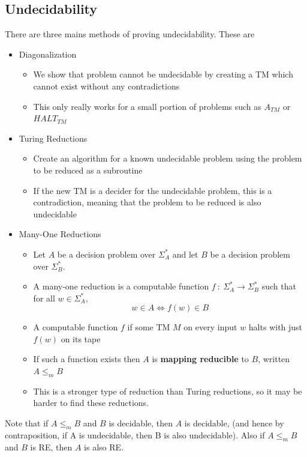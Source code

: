 \documentclass{article}
\begin{document}
    \subsection{Undecidability}
        There are three mains methods of proving undecidability. These are
        \begin{itemize}
            \item Diagonalization
            \begin{itemize}
                \item We show that problem cannot be undecidable by creating a TM which cannot exist without any contradictions
                \item This only really works for a small portion of problems such as $A_{TM}$ or $HALT_{TM}$
            \end{itemize}
            \item Turing Reductions
            \begin{itemize}
                \item Create an algorithm for a known undecidable problem using the problem to be reduced as a subroutine
                \item If the new TM is a decider for the undecidable problem, this is a contradiction, meaning that the problem to be reduced is also undecidable
            \end{itemize}
            \item Many-One Reductions
            \begin{itemize}
                \item Let $A$ be a decision problem over $\Sigma^*_A$ and let $B$ be a decision problem over $\Sigma^*_B$.
                \item A many-one reduction is a computable function $f \ : \ \Sigma^*_A \to \Sigma^*_B$ such that for all $w \in \Sigma^*_A$, 
                \[ w \in A \iff f(w) \in B \]
                \item A computable function $f$ if some TM $M$ on every input $w$ halts with just $f(w)$ on its tape
                \item If such a function exists then $A$ is \textbf{mapping reducible} to $B$, written $A \leq_m B$
                \item This is a stronger type of reduction than Turing reductions, so it may be harder to find these reductions. 
            \end{itemize}
        \end{itemize}
        Note that if $A \leq_m B$ and $B$ is decidable, then $A$ is decidable, (and hence by contraposition, if A is undecidable, then B is also undecidable). Also if $A \leq_m B$ and $B$ is RE, then $A$ is also RE. 
\end{document}

